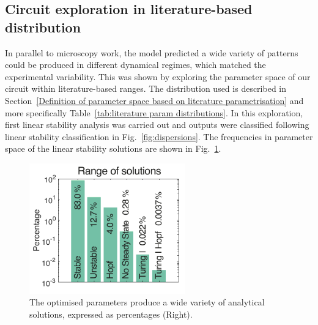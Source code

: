 \subsection{Circuit exploration in literature-based distribution}
In parallel to microscopy work, the model predicted a wide variety of patterns could be produced in different dynamical regimes, which matched the experimental variability.
This was shown by exploring the parameter space of our circuit within literature-based ranges.
The distribution used is described in Section~\ref{Definition of parameter space based on literature parametrisation} and more specifically Table~\ref{tab:literature param distributions}.
In this exploration, first linear stability analysis was carried out and outputs were classified following linear stability classification in Fig.~\ref{fig:dispersions}.
The frequencies in parameter space of the linear stability solutions are shown in Fig.~\ref{system_class_frequencies}.
\begin{figure}[H]
    \centering

    \includegraphics[width=0.6\textwidth]{chapters/Chapter 3/system_class_frequencies}
    \caption{The optimised parameters produce a wide variety of analytical solutions, expressed as percentages (Right). }
    \label{system_class_frequencies}
\end{figure}

